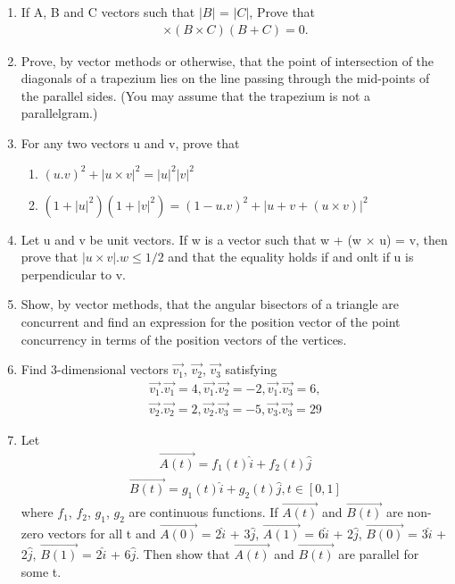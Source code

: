 \begin{enumerate}[label=\arabic*.,ref=\thesubsection.\theenumi]
\item If A, B and C vectors such that $|B|$ = $|C|$, Prove that
\begin{align*}
[(A+B) \times (A+C)] \times (B \times C)(B + C) = 0.
\end{align*}

\item Prove, by vector methods or otherwise, that the point of intersection of the diagonals of a trapezium lies on the line passing through the mid-points of the parallel sides. (You may assume that the trapezium is not a parallelgram.)

\item For any two vectors u and v, prove that
\begin{enumerate}
\item $(u.v)^{2} + |u \times v|^{2} = |u|^{2}|v|^{2}$
\item $(1 + |u|^{2})(1 + |v|^{2}) = (1 - u.v)^{2} + |u + v + (u \times v)|^{2}$
\end{enumerate}

\item Let u and v be unit vectors. If w is a vector such that w + (w $\times$ u) = v, then prove that $|u \times v|.w \leq 1/2$ and that the equality holds if and onlt if u is perpendicular to v.

\item Show, by vector methods, that the angular bisectors of a triangle are concurrent and find an expression for the position vector of the point concurrency in terms of the position vectors of the vertices.

\item Find 3-dimensional vectors $\overrightarrow{v_1}$, $\overrightarrow{v_2}$, $\overrightarrow{v_3}$ satisfying
\begin{align*}
\overrightarrow{v_1}.\overrightarrow{v_1} = 4, \overrightarrow{v_1}.\overrightarrow{v_2} = -2, \overrightarrow{v_1}.\overrightarrow{v_3} = 6, 
\end{align*}
\begin{align*}
\overrightarrow{v_2}.\overrightarrow{v_2} = 2, \overrightarrow{v_2}.\overrightarrow{v_3} = -5, \overrightarrow{v_3}.\overrightarrow{v_3} = 29
\end{align*}

\item Let 
\begin{align*}
\overrightarrow{A(t)} = f_1(t)\hat{i} + f_2(t)\hat{j}
\end{align*}
\begin{align*}
\overrightarrow{B(t)} = g_1(t)\hat{i} + g_2(t)\hat{j}, t \in [0,1]
\end{align*}
where $f_1$, $f_2$, $g_1$, $g_2$ are continuous functions. If $\overrightarrow{A(t)}$ and $\overrightarrow{B(t)}$ are non-zero vectors for all t and $\overrightarrow{A(0)}$ = 2$\hat{i}$ + 3$\hat{j}$, $\overrightarrow{A(1)}$ = 6$\hat{i}$ + 2$\hat{j}$, $\overrightarrow{B(0)}$ = 3$\hat{i}$ + 2$\hat{j}$, 
$\overrightarrow{B(1)}$ = 2$\hat{i}$ + 6$\hat{j}$. Then show that $\overrightarrow{A(t)}$ and $\overrightarrow{B(t)}$ are parallel for some t.


\end{enumerate}
